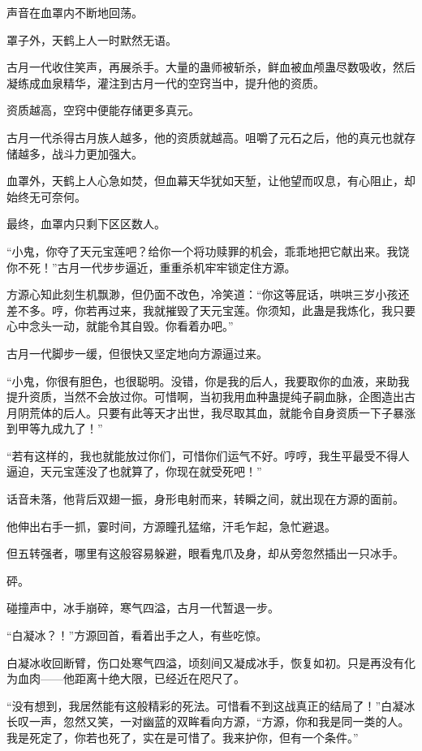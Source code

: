 \begin{this_body}
声音在血罩内不断地回荡。

罩子外，天鹤上人一时默然无语。

古月一代收住笑声，再展杀手。大量的蛊师被斩杀，鲜血被血颅蛊尽数吸收，然后凝练成血泉精华，灌注到古月一代的空窍当中，提升他的资质。

资质越高，空窍中便能存储更多真元。

古月一代杀得古月族人越多，他的资质就越高。咀嚼了元石之后，他的真元也就存储越多，战斗力更加强大。

血罩外，天鹤上人心急如焚，但血幕天华犹如天堑，让他望而叹息，有心阻止，却始终无可奈何。

最终，血罩内只剩下区区数人。

“小鬼，你夺了天元宝莲吧？给你一个将功赎罪的机会，乖乖地把它献出来。我饶你不死！”古月一代步步逼近，重重杀机牢牢锁定住方源。

方源心知此刻生机飘渺，但仍面不改色，冷笑道：“你这等屁话，哄哄三岁小孩还差不多。哼，你若再过来，我就摧毁了天元宝莲。你须知，此蛊是我炼化，我只要心中念头一动，就能令其自毁。你看着办吧。”

古月一代脚步一缓，但很快又坚定地向方源逼过来。

“小鬼，你很有胆色，也很聪明。没错，你是我的后人，我要取你的血液，来助我提升资质，当然不会放过你。可惜啊，当初我用血种蛊提纯子嗣血脉，企图造出古月阴荒体的后人。只要有此等天才出世，我尽取其血，就能令自身资质一下子暴涨到甲等九成九了！”

“若有这样的，我也就能放过你们，可惜你们运气不好。哼哼，我生平最受不得人逼迫，天元宝莲没了也就算了，你现在就受死吧！”

话音未落，他背后双翅一振，身形电射而来，转瞬之间，就出现在方源的面前。

他伸出右手一抓，霎时间，方源瞳孔猛缩，汗毛乍起，急忙避退。

但五转强者，哪里有这般容易躲避，眼看鬼爪及身，却从旁忽然插出一只冰手。

砰。

碰撞声中，冰手崩碎，寒气四溢，古月一代暂退一步。

“白凝冰？！”方源回首，看着出手之人，有些吃惊。

白凝冰收回断臂，伤口处寒气四溢，顷刻间又凝成冰手，恢复如初。只是再没有化为血肉——他距离十绝大限，已经近在咫尺了。

“没有想到，我居然能有这般精彩的死法。可惜看不到这战真正的结局了！”白凝冰长叹一声，忽然又笑，一对幽蓝的双眸看向方源，“方源，你和我是同一类的人。我是死定了，你若也死了，实在是可惜了。我来护你，但有一个条件。”


\end{this_body}

